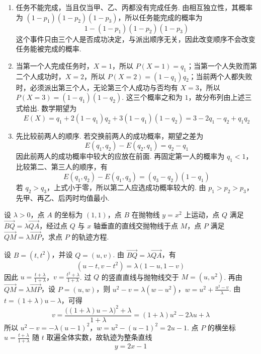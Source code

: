 \begin{solution}
\begin{enumerate}
\item 任务不能完成，当且仅当甲、乙、丙都没有完成任务. 由相互独立性，其概率为 \((1-p_1)(1-p_2)(1-p_3)\)，所以任务能完成的概率为
\[
1-(1-p_1)(1-p_2)(1-p_3)
\]
这个事件只由三个人是否成功决定，与派出顺序无关，因此改变顺序不会改变任务能被完成的概率.
\item 当第一个人完成任务时，\(X=1\)，所以 \(P(X=1)=q_1\)；当第一个人失败而第二个人成功时，\(X=2\)，所以 \(P(X=2)=(1-q_1)q_2\)；当前两个人都失败时，必须派出第三个人，无论第三个人成功与否均有 \(X=3\)，所以 \(P(X=3)=(1-q_1)(1-q_2)\). 这三个概率之和为 \(1\)，故分布列由上述三式给出. 数学期望为
\[
E(X)=q_1+2(1-q_1)q_2+3(1-q_1)(1-q_2)=3-2q_1-q_2+q_1q_2
\]
\item 先比较前两人的顺序. 若交换前两人的成功概率，期望之差为
\[
E(q_1,q_2)-E(q_2,q_1)=q_2-q_1
\]
因此前两人的成功概率中较大的应放在前面. 再固定第一人的概率为 \(q_1<1\)，比较第二、第三人的顺序，有
\[
E(q_1,q_2)-E(q_1,q_3)=(q_3-q_2)(1-q_1)
\]
若 \(q_2>q_3\)，上式小于零，所以第二人应选成功概率较大的. 由 \(p_1>p_2>p_3\)，先甲、再乙、后丙时均值最小.
\end{enumerate}
\end{solution}

\begin{problem}
设 \(\lambda > 0\)，点 \(A\) 的坐标为 \((1,1)\)，点 \(B\) 在抛物线 \(y = x^2\) 上运动，点 \(Q\) 满足 \(\overrightarrow{BQ} = \lambda \overrightarrow{QA}\)，经过点 \(Q\) 与 \(x\) 轴垂直的直线交抛物线于点 \(M\)，点 \(P\) 满足 \(\overrightarrow{QM} = \lambda \overrightarrow{MP}\)，求点 \(P\) 的轨迹方程.

\end{problem}

\begin{solution}
设 \(B=(t,t^2)\)，并设 \(Q=(u,v)\). 由 \(\overrightarrow{BQ}=\lambda\overrightarrow{QA}\)，有
\[
(u-t,v-t^2)=\lambda(1-u,1-v)
\]
因此
\(u=\frac{t+\lambda}{1+\lambda}\)，\(v=\frac{t^2+\lambda}{1+\lambda}\).
过 \(Q\) 的竖直直线与抛物线交于 \(M=(u,u^2)\). 再由 \(\overrightarrow{QM}=\lambda\overrightarrow{MP}\)，设 \(P=(u,w)\)，则
\(u^2-v=\lambda(w-u^2)\)，\(w=u^2+\frac{u^2-v}{\lambda}\).
由 \(t=(1+\lambda)u-\lambda\)，可得
\[
v=\frac{\bigl((1+\lambda)u-\lambda\bigr)^2+\lambda}{1+\lambda}
=(1+\lambda)u^2-2\lambda u+\lambda
\]
所以
\(u^2-v=-\lambda(u-1)^2\)，\(w=u^2-(u-1)^2=2u-1\).
点 \(P\) 的横坐标 \(u=\frac{t+\lambda}{1+\lambda}\) 随 \(t\) 取遍全体实数，故轨迹为整条直线
\[
y=2x-1
\]
\end{solution}
